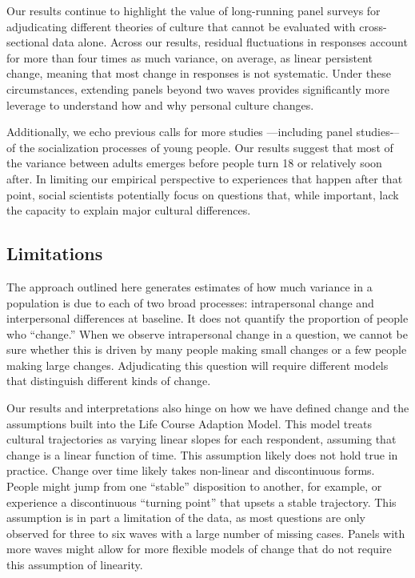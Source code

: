 \documentclass[
  11pt,
]{article}
\begin{document}
Our results continue to highlight the value of long-running panel
surveys for adjudicating different theories of culture that cannot be
evaluated with cross-sectional data alone. Across our results, residual
fluctuations in responses account for more than four times as much
variance, on average, as linear persistent change, meaning that most
change in responses is not systematic. Under these circumstances,
extending panels beyond two waves provides significantly more leverage
to understand how and why personal culture changes.

Additionally, we echo previous calls for more studies ---including panel
studies-\/-- of the socialization processes of young people. Our results
suggest that most of the variance between adults emerges before people
turn 18 or relatively soon after. In limiting our empirical perspective
to experiences that happen after that point, social scientists
potentially focus on questions that, while important, lack the capacity
to explain major cultural differences.

\hypertarget{limitations}{%
\subsection{Limitations}\label{limitations}}

The approach outlined here generates estimates of how much variance in a
population is due to each of two broad processes: intrapersonal change
and interpersonal differences at baseline. It does not quantify the
proportion of people who ``change.'' When we observe intrapersonal
change in a question, we cannot be sure whether this is driven by many
people making small changes or a few people making large changes.
Adjudicating this question will require different models that
distinguish different kinds of change.

Our results and interpretations also hinge on how we have defined change
and the assumptions built into the Life Course Adaption Model. This
model treats cultural trajectories as varying linear slopes for each
respondent, assuming that change is a linear function of time. This
assumption likely does not hold true in practice. Change over time
likely takes non-linear and discontinuous forms. People might jump from
one ``stable'' disposition to another, for example, or experience a
discontinuous ``turning point'' that upsets a stable trajectory. This
assumption is in part a limitation of the data, as most questions are
only observed for three to six waves with a large number of missing
cases. Panels with more waves might allow for more flexible models of
change that do not require this assumption of linearity.
\end{document}

